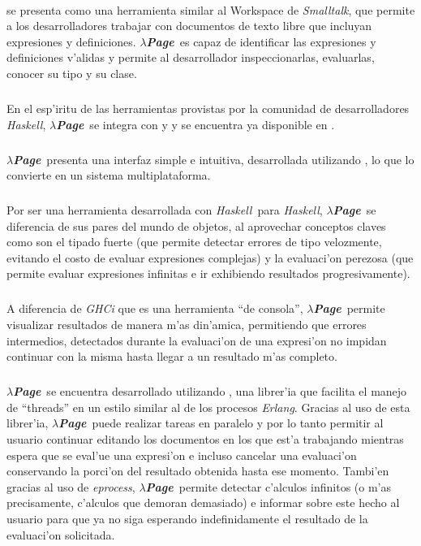 \documentclass[a4paper]{article}
\newcommand{\haskell}{\textsl{Haskell}}
\newcommand{\hpage}{\textbf{\textsl{$\lambda$Page}}}
\begin{document}
\paragraph{} \htmladdnormallinkfoot{\hpage}{http://haskell.hpage.com} se presenta como una herramienta  similar al Workspace de \textit{Smalltalk}, que permite a los desarrolladores trabajar con documentos de texto libre que incluyan expresiones y definiciones.  \hpage\ es capaz de identificar las expresiones y definiciones v'alidas y permite al desarrollador inspeccionarlas, evaluarlas, conocer su tipo y su clase.
\subparagraph{}En el esp'iritu de las herramientas provistas por la comunidad de desarrolladores \haskell, \hpage\ se integra con  y  y se encuentra ya disponible en .
\subparagraph{}\hpage\ presenta una interfaz simple e intuitiva, desarrollada utilizando , lo que lo convierte en un sistema multiplataforma.
\subparagraph{}Por ser una herramienta desarrollada con \haskell\ para \haskell, \hpage\ se diferencia de sus pares del mundo de objetos, al aprovechar conceptos claves como son el tipado fuerte (que permite detectar errores de tipo velozmente, evitando el costo de evaluar expresiones complejas) y la evaluaci'on perezosa (que permite evaluar expresiones infinitas e ir exhibiendo resultados progresivamente).
\subparagraph{}A diferencia de \textsl{GHCi} que es una herramienta ``de consola'', \hpage\ permite visualizar resultados de manera m'as din'amica, permitiendo que errores intermedios, detectados durante la evaluaci'on de una expresi'on no impidan continuar con la misma hasta llegar a un resultado m'as completo.
\subparagraph{}\hpage\ se encuentra desarrollado utilizando , una librer'ia que facilita el manejo de ``threads'' en un estilo similar al de los procesos \textsl{Erlang}.  Gracias al uso de esta librer'ia, \hpage\ puede realizar tareas en paralelo y por lo tanto permitir al usuario continuar editando los documentos en los que est'a trabajando mientras espera que se eval'ue una expresi'on e incluso cancelar una evaluaci'on conservando la porci'on del resultado obtenida hasta ese momento.  Tambi'en gracias al uso de \textsl{eprocess}, \hpage\ permite detectar c'alculos infinitos (o m'as precisamente, c'alculos que demoran demasiado) e informar sobre este hecho al usuario para que ya no siga esperando indefinidamente el resultado de la evaluaci'on solicitada.
\newpage
\end{document}
